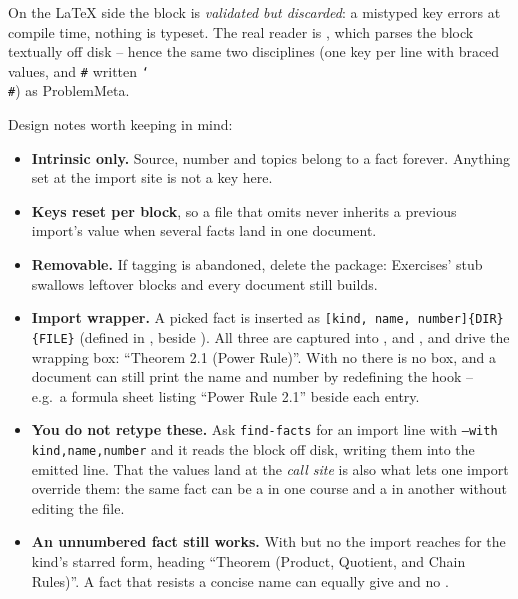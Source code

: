 On the \LaTeX{} side the block is
\emph{validated but discarded}: a mistyped key errors at compile time, nothing is
typeset. The real reader is , which parses the block textually
off disk -- hence the same two disciplines (one key per line with braced values,
and \texttt{\#} written \texttt{\char`\\\#}) as ProblemMeta.

Design notes worth keeping in mind:

\begin{itemize}
  \item \textbf{Intrinsic only.} Source, number and topics belong to a fact
    forever. Anything set at the import site is not a key here.
  \item \textbf{Keys reset per block}, so a file that omits  never
    inherits a previous import's value when several facts land in one document.
  \item \textbf{Removable.} If tagging is abandoned, delete the package:
    Exercises'  stub swallows leftover  blocks
    and every document still builds.
  \item \textbf{Import wrapper.} A picked fact is inserted as
    \texttt{[kind, name, number]\{DIR\}\{FILE\}} (defined
    in , beside ). All three are captured
    into ,  and ,
    and drive the wrapping box: ``Theorem 2.1 (Power Rule)''. With no 
    there is no box, and a document can still print the name and number by
    redefining the  hook -- e.g.\ a formula sheet listing
    ``Power Rule 2.1'' beside each entry.
  \item \textbf{You do not retype these.} Ask \texttt{find-facts} for an
    import line with \texttt{--with kind,name,number} and it reads the block
    off disk, writing them into the emitted  line. That the
    values land at the \emph{call site}
    is also what lets one import override them: the same fact can be a
     in one course and a  in another without editing
    the file.
  \item \textbf{An unnumbered fact still works.} With  but no
     the import reaches for the kind's starred form, heading
    ``Theorem (Product, Quotient, and Chain Rules)''. A fact that resists a
    concise name can equally give  and no .
\end{itemize}
